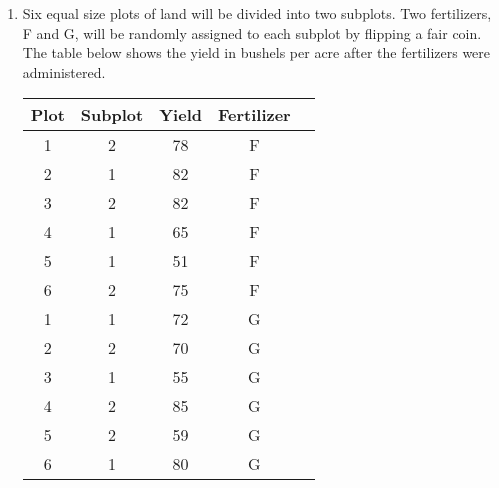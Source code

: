 \documentclass[11pt, oneside]{article}   	%
\begin{document}
\begin{enumerate}



\newpage

\item Six equal size plots of land will be divided into two subplots. Two fertilizers, F and G, will be randomly assigned to each subplot by flipping a fair coin.  The table below shows the yield in bushels per acre after the fertilizers were administered. 


\begin{table}[h!]
\begin{center}
\begin{tabular}{c c |c c c }
Plot & Subplot & Yield & Fertilizer\\
\hline
1 & 2 & 78 & F\\
2 & 1 & 82 & F\\
3 & 2 & 82 & F\\
4 & 1 & 65 & F\\
5 & 1 & 51 & F \\
6 & 2 & 75 & F \\
1 & 1 & 72 & G \\
2 & 2 & 70 & G \\
3 & 1 & 55 & G \\
4 & 2 & 85 & G \\
5 & 2 & 59 & G \\
6 & 1 & 80 & G 

\end{tabular}
\end{center}
\label{default}
\end{table}


\end{enumerate}
\end{document}
